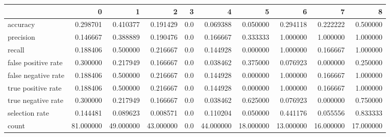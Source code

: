 \begin{tabular}{lrrrrrrrrr}
\toprule
{} &          0 &          1 &          2 &    3 &          4 &          5 &          6 &          7 &          8 \\
\midrule
accuracy            &   0.298701 &   0.410377 &   0.191429 &  0.0 &   0.069388 &   0.050000 &   0.294118 &   0.222222 &   0.500000 \\
precision           &   0.146667 &   0.388889 &   0.190476 &  0.0 &   0.166667 &   0.333333 &   1.000000 &   1.000000 &   1.000000 \\
recall              &   0.188406 &   0.500000 &   0.216667 &  0.0 &   0.144928 &   0.000000 &   1.000000 &   0.166667 &   1.000000 \\
false positive rate &   0.300000 &   0.217949 &   0.166667 &  0.0 &   0.038462 &   0.375000 &   0.076923 &   0.000000 &   0.250000 \\
false negative rate &   0.188406 &   0.500000 &   0.216667 &  0.0 &   0.144928 &   0.000000 &   1.000000 &   0.166667 &   1.000000 \\
true positive rate  &   0.188406 &   0.500000 &   0.216667 &  0.0 &   0.144928 &   0.000000 &   1.000000 &   0.166667 &   1.000000 \\
true negative rate  &   0.300000 &   0.217949 &   0.166667 &  0.0 &   0.038462 &   0.625000 &   0.076923 &   0.000000 &   0.750000 \\
selection rate      &   0.144481 &   0.089623 &   0.008571 &  0.0 &   0.110204 &   0.050000 &   0.441176 &   0.055556 &   0.833333 \\
count               &  81.000000 &  49.000000 &  43.000000 &  0.0 &  44.000000 &  18.000000 &  13.000000 &  16.000000 &  17.000000 \\
\bottomrule
\end{tabular}
